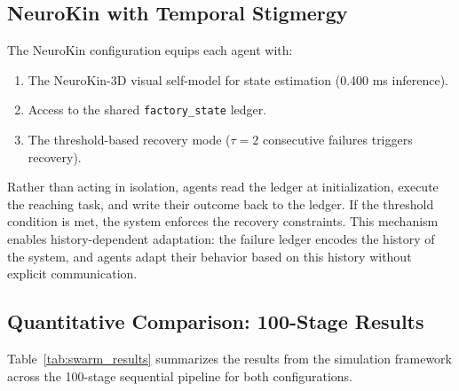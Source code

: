 \documentclass[12pt,a4paper,oneside]{report}
\begin{document}
\subsection{NeuroKin with Temporal Stigmergy}

The NeuroKin configuration equips each agent with:
\begin{enumerate}
    \item The NeuroKin-3D visual self-model for state estimation (0.400 ms inference).
    \item Access to the shared \texttt{factory\_state} ledger.
    \item The threshold-based recovery mode ($\tau = 2$ consecutive failures triggers recovery).
\end{enumerate}

Rather than acting in isolation, agents read the ledger at initialization, execute the reaching task, and write their outcome back to the ledger. If the threshold condition is met, the system enforces the recovery constraints. This mechanism enables history-dependent adaptation: the failure ledger encodes the history of the system, and agents adapt their behavior based on this history without explicit communication.

\subsection{Quantitative Comparison: 100-Stage Results}

Table~\ref{tab:swarm_results} summarizes the results from the simulation framework across the 100-stage sequential pipeline for both configurations.

\begin{table}[H]
\centering
\caption{Sequential swarm performance comparison (100 stages, progressive fault injection).}
\label{tab:swarm_results}
\end{table}
\end{document}
